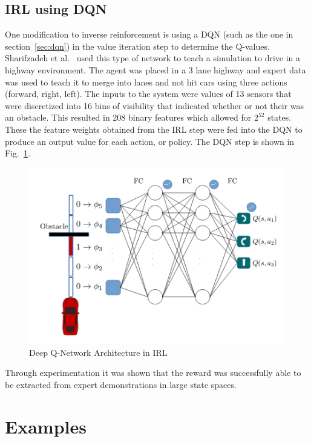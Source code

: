 \documentclass[12pt,american]{report}
\begin{document}
\subsection{IRL using DQN}
One modification to inverse reinforcement is using a DQN (such as the one in section~\ref{sec:dqn}) in the value iteration step to determine the Q-values. Sharifzadeh et al.~\cite{sharifzadeh2016learning} used this type of network to teach a simulation to drive in a highway environment. The agent was placed in a 3 lane highway and expert data was used to teach it to merge into lanes and not hit cars using three actions (forward, right, left).  The inputs to the system were values of 13 sensors that were discretized into 16 bins of visibility that indicated whether or not their was an obstacle. This resulted in 208 binary features which allowed for $2^{52}$ states. These the feature weights obtained from the IRL step were fed into the DQN to produce an output value for each action, or policy. The DQN step is shown in Fig.~\ref{fig:irl-dqn}.
\begin{figure}
\centering
\includegraphics[scale=.85]{images/irl-dqn.png}
\caption{Deep Q-Network Architecture in IRL~\cite{sharifzadeh2016learning}}
\label{fig:irl-dqn}
\end{figure}
Through experimentation it was shown that the reward was successfully able to be extracted from expert demonstrations in large state spaces.


\section{Examples}
\end{document}
